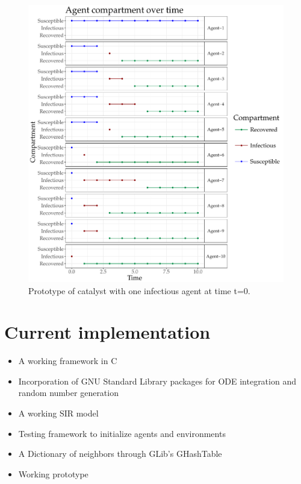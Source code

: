 \documentclass{article}
\begin{document}
\begin{figure}[H]
\center
\includegraphics[width=\textwidth]{images/agents-plot.pdf}
\caption{Prototype of catalyst with one infectious agent at time t=0.}\label{fig:working-prototype}
\end{figure}

\section{Current implementation}
\label{sec-3}
\begin{itemize}
\item A working framework in C
\item Incorporation of GNU Standard Library packages for ODE integration and random number generation
\item A working SIR model
\item Testing framework to initialize agents and environments
\item A Dictionary of neighbors through GLib's GHashTable
\item Working prototype
\end{itemize}
\end{document}
